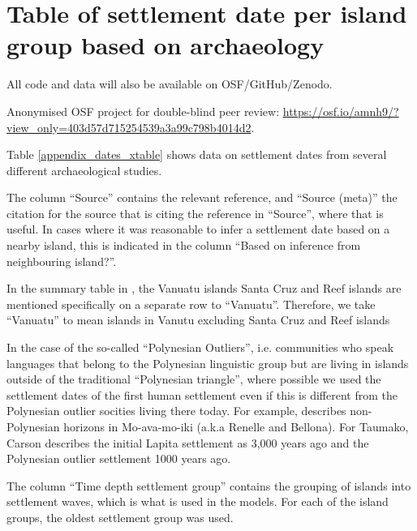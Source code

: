 \documentclass[12pt,letterpaper]{article}
\begin{document}
\newpage

\section{Table of settlement date per island group based on archaeology}
\singlespacing
\label{appendix_dates_table_appendix}
All code and data will also be available on OSF/GitHub/Zenodo.

Anonymised OSF project for double-blind peer review: \url{https://osf.io/amnh9/?view_only=403d57d715254539a3a99c798b4014d2}.

Table \ref{appendix_dates_xtable} shows data on settlement dates from several different archaeological studies. 

The column ``Source'' contains the relevant reference, and ``Source (meta)'' the citation for the source that is citing the reference in ``Source'', where that is useful. In cases where it was reasonable to infer a settlement date based on a nearby island, this is indicated in the column ``Based on inference from neighbouring island?''.

In the summary table in \citet{rieth_cochrane_2018},  the Vanuatu islands Santa Cruz and Reef islands are mentioned specifically on a separate row to ``Vanuatu''. Therefore, we take ``Vanuatu'' to mean islands in Vanutu excluding Santa Cruz and Reef islands 

In the case of the so-called ``Polynesian Outliers'', i.e. communities who speak languages that belong to the Polynesian linguistic group but are living in islands outside of the traditional ``Polynesian triangle'', where possible we used the settlement dates of the first human settlement even if this is different from the Polynesian outlier socities living there today. For example, \citet{carson2012recent} describes non-Polynesian horizons in Mo-ava-mo-iki (a.k.a Renelle and Bellona). For Taumako, Carson describes the initial Lapita settlement as 3,000 years ago and the Polynesian outlier settlement 1000 years ago.

The column ``Time depth settlement group'' contains the grouping of islands into settlement waves, which is what is used in the models. For each of the island groups, the oldest settlement group was used.

\begin{landscape}

\end{landscape}


\FloatBarrier
\newpage
\end{document}
